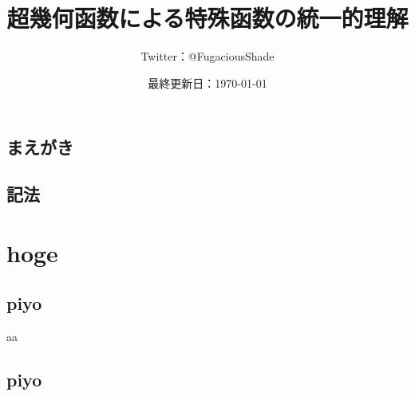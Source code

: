 \documentclass[a4paper,oneside,openany]{ltjsbook} %
\title{超幾何函数による特殊函数の統一的理解}
\author{Twitter：@FugaciousShade}
\date{最終更新日：\today}
\begin{document}
\maketitle %

\chapter*{まえがき}{
    
}

\setcounter{tocdepth}{4}  %
\tableofcontents  %

\chapter*{記法}{

}

\part{hoge}{
    \chapter{piyo}{
        aa
    }
}

\appendix
\chapter{piyo}



\end{document}
